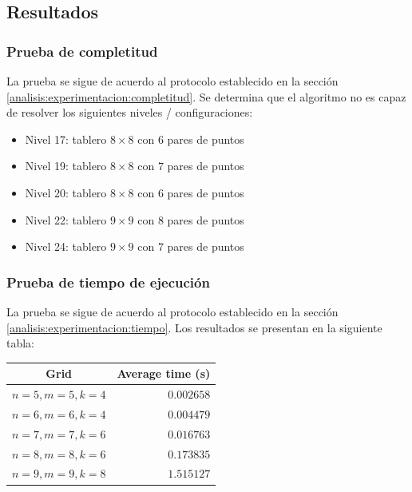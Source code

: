 \documentclass[letter,12pt]{article}
\begin{document}
\subsection{Resultados} \label{analisis:resultados}

\subsubsection{Prueba de completitud} \label{analisis:resultados:completitud}

La prueba se sigue de acuerdo al protocolo establecido en la sección \ref{analisis:experimentacion:completitud}. Se determina que el algoritmo no es capaz de resolver los siguientes niveles / configuraciones:

\begin{itemize}
    \item Nivel 17: tablero $8 \times 8$ con $6$ pares de puntos
    \item Nivel 19: tablero $8 \times 8$ con $7$ pares de puntos
    \item Nivel 20: tablero $8 \times 8$ con $6$ pares de puntos
    \item Nivel 22: tablero $9 \times 9$ con $8$ pares de puntos
    \item Nivel 24: tablero $9 \times 9$ con $7$ pares de puntos
\end{itemize}

\subsubsection{Prueba de tiempo de ejecución} \label{analisis:resultados:tiempo}

La prueba se sigue de acuerdo al protocolo establecido en la sección \ref{analisis:experimentacion:tiempo}. Los resultados se presentan en la siguiente tabla:

\begin{table}[ht!]
\begin{tabular}{|l|r|}
\hline
\multicolumn{1}{|c|}{\textbf{Grid}} & \multicolumn{1}{c|}{\textbf{Average time (s)}} \\ \hline
$n=5, m=5, k=4$                       & $0.002658$                                       \\ \hline
$n=6, m=6, k=4$                       & $0.004479$                                       \\ \hline
$n=7, m=7, k=6$                       & $0.016763$                                       \\ \hline
$n=8, m=8, k=6$                       & $0.173835$                                       \\ \hline
$n=9, m=9, k=8$                       & $1.515127$                                       \\ \hline
\end{tabular}
\end{table}
\end{document}
